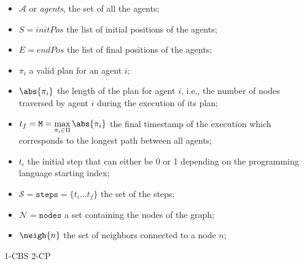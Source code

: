 \begin{itemize}
  \item $\mathcal{A}$ or \textit{agents}, the set of all the agents;
  \item $S=initPos$ the list of initial positions of the agents;
  \item $E=endPos$ the list of final positions of the agents;
  \item $\pi_i$ a valid plan for an agent $i$;
  \item $\abs{\pi_i}$ the length of the plan for agent $i$, i.e., the number
    of nodes traversed by agent $i$ during the execution of its plan;
  \item $t_f= \texttt{M}= \max\limits_{\pi_i\in\Pi}\abs{\pi_i}$ the final
    timestamp of the execution which corresponds to the longest path between 
    all agents;
  \item $t_i$ the initial step that can either be 0 or 1 depending on the
    programming language starting index;
  \item $\mathcal{S}=\texttt{steps}=\{t_i...t_f\}$ the set of the steps; 
  \item $\mathcal{N}=\texttt{nodes}$ a set containing the nodes of the graph;
  \item $\neigh{n}$ the set of neighbors connected to a node $n$;
\end{itemize}
%
%
%
{1-CBS}
{2-CP}
